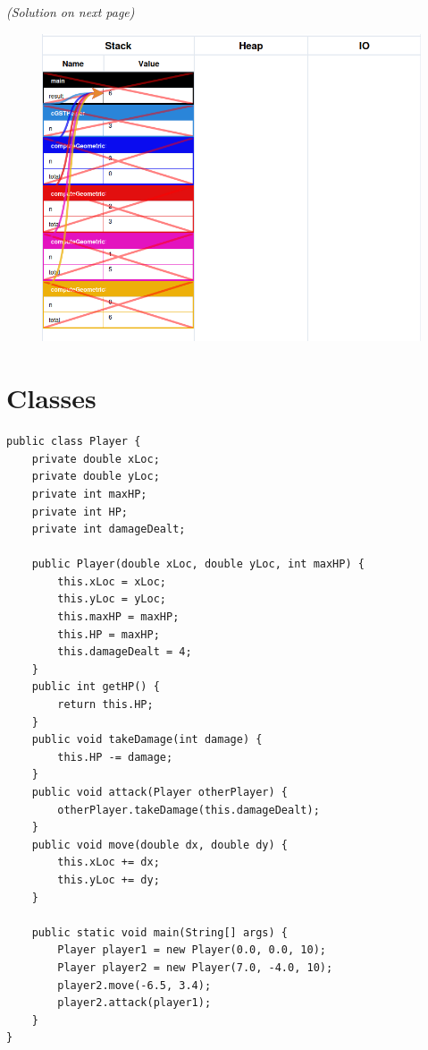 \documentclass{article}
\begin{document}
\textit{(Solution on next page)}

\begin{figure}[H]
	\centering
	\includegraphics{recursionTail.png}
\end{figure}

\pagebreak


\section{Classes}

\begin{verbatim}
public class Player {
    private double xLoc;
    private double yLoc;
    private int maxHP;
    private int HP;
    private int damageDealt;

    public Player(double xLoc, double yLoc, int maxHP) {
        this.xLoc = xLoc;
        this.yLoc = yLoc;
        this.maxHP = maxHP;
        this.HP = maxHP;
        this.damageDealt = 4;
    }
    public int getHP() {
        return this.HP;
    }
    public void takeDamage(int damage) {
        this.HP -= damage;
    }
    public void attack(Player otherPlayer) {
        otherPlayer.takeDamage(this.damageDealt);
    }
    public void move(double dx, double dy) {
        this.xLoc += dx;
        this.yLoc += dy;
    }

    public static void main(String[] args) {
        Player player1 = new Player(0.0, 0.0, 10);
        Player player2 = new Player(7.0, -4.0, 10);
        player2.move(-6.5, 3.4);
        player2.attack(player1);
    }
}
\end{verbatim}
\end{document}

